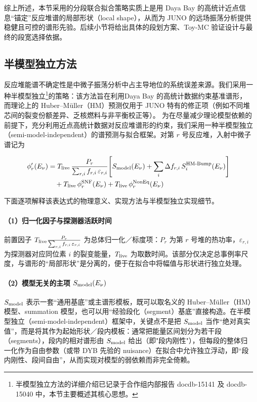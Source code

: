 综上所述，本节采用的分段联合拟合策略实质上是用 Daya Bay 的高统计近点信息“锚定”反应堆谱的局部形状（local shape），从而为 JUNO 的远场振荡分析提供稳健且可控的谱形先验。后续小节将给出具体的段划方案、Toy-MC 验证设计与最终的段宽选择依据。
    
\subsection{半模型独立方法}

反应堆能谱不确定性是中微子振荡分析中占主导地位的系统误差来源。我们采用一种半模型独立\footnote{半模型独立方法的详细介绍已记录于合作组内部报告 docdb-15141 及 docdb-15040 中，本节主要概述其核心思想。}的策略：该方法旨在利用Daya Bay 的高统计数据约束基准谱形，而理论上的 Huber–Müller（HM）预测仅用于 JUNO 特有的修正项（例如不同堆芯间的裂变份额差异、乏核燃料与非平衡校正等）。
为在尽量减少理论模型依赖的前提下，充分利用近点高统计数据对反应堆谱形的约束，我们采用一种半模型独立（semi-model-independent）的谱预测与拟合框架。对第 $r$ 号反应堆，入射中微子谱记为

\begin{equation}\begin{aligned}
\phi'_r(E_\nu)
&=T_{\rm live}\,
\frac{P_r}{\sum_{r,i} f_{r,i}\,\varepsilon_{r,i}}
\Bigg[
S_{\rm model}(E_\nu)
+\sum_i \Delta f_{r,i}\,S_i^{\rm HM\text{-}Bump}(E_\nu)
\Bigg] \\
&\quad
+ T_{\rm live}\,\phi^{\rm SNF}_r(E_\nu)
+ T_{\rm live}\,\phi^{\rm NonEq}_r(E_\nu)
\end{aligned}
\label{eq:phi:semi-model-independent}
\end{equation}

下面逐项解释该表达式的物理意义、实现方法与半模型独立实现细节。

\paragraph*{（1）归一化因子与探测器活跃时间}
前置因子 $T_{\rm live}\frac{P_r}{\sum_{r,i} f_{r,i}\,\varepsilon_{r,i}}$ 为总体归一化／标度项：$P_r$ 为第 $r$ 号堆的热功率，$\varepsilon_{r,i}$ 为探测器对应同位素 $i$ 的裂变能量，$T_{\rm live}$ 为取数时间。该部分仅决定总事例率尺度，与谱形的“局部形状”是分离的，便于在拟合中将幅值与形状进行独立处理。

\paragraph*{（2）模型无关的主项 $S_{\rm model}(E_\nu)$}
$S_{\rm model}$ 表示一套“通用基底”或主谱形模板，既可以取名义的 Huber--Müller（HM）模型、summation 模型，也可以用“经验段化（segment）基底”直接构造。在半模型独立（semi-model-independent）框架中，关键点不是把 $S_{\rm model}$ 当作“绝对真实值”，而是将其作为起始形状／段内模板：通常把能量区间划分为若干段（segments），段内的相对谱形由 $S_{\rm model}$ 给出（即"段内刚性"），但每段的整体归一化作为自由参数（或带 DYB 先验的 nuisance）在拟合中允许独立浮动，即“段内刚性、段间自由”，从而实现对模型的弱依赖而非完全倚赖。


